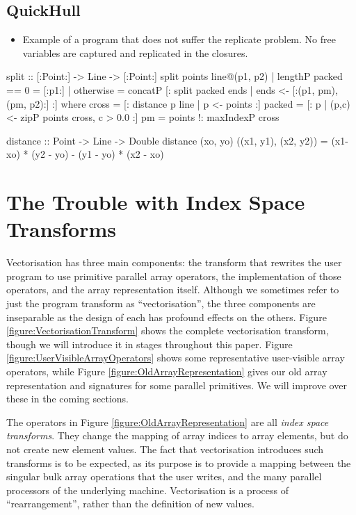 \clearpage{}
\subsection{QuickHull}
\begin{itemize}
\item	Example of a program that does not suffer the replicate problem. No free variables are captured and replicated in the closures.
\end{itemize}

\begin{small}
\begin{code}
split :: [:Point:] -> Line -> [:Point:]
split points line@(p1, p2)
 | lengthP packed == 0 = [:p1:]
 | otherwise
 = concatP [: split packed ends 
            | ends <- [:(p1, pm), (pm, p2):] :]
 where
  cross  = [: distance p line | p <- points :]
  packed = [: p | (p,c) <- zipP points cross, c > 0.0 :]
  pm     = points !: maxIndexP cross

distance :: Point -> Line -> Double
distance (xo, yo) ((x1, y1), (x2, y2))
 = (x1-xo) * (y2 - yo) - (y1 - yo) * (x2 - xo)
\end{code}
\end{small}


\clearpage{}
\section{The Trouble with Index Space Transforms}

Vectorisation has three main components: the transform that rewrites the user program to use primitive parallel array operators, the implementation of those operators, and the array representation itself. Although we sometimes refer to just the program transform as ``vectorisation'', the three components are inseparable as the design of each has profound effects on the others. Figure \ref{figure:VectorisationTransform} shows the complete vectorisation transform, though we will introduce it in stages throughout this paper. Figure \ref{figure:UserVisibleArrayOperators} shows some representative user-visible array operators, while Figure \ref{figure:OldArrayRepresentation} gives our old array representation and signatures for some parallel primitives. We will improve over these in the coming sections.

The operators in Figure \ref{figure:OldArrayRepresentation} are all \emph{index space transforms}. They change the mapping of array indices to array elements, but do not create new element values. The fact that vectorisation introduces such transforms is to be expected, as its purpose is to provide a mapping between the singular bulk array operations that the user writes, and the many parallel processors of the underlying machine. Vectorisation is a process of ``rearrangement'', rather than the definition of new values.

